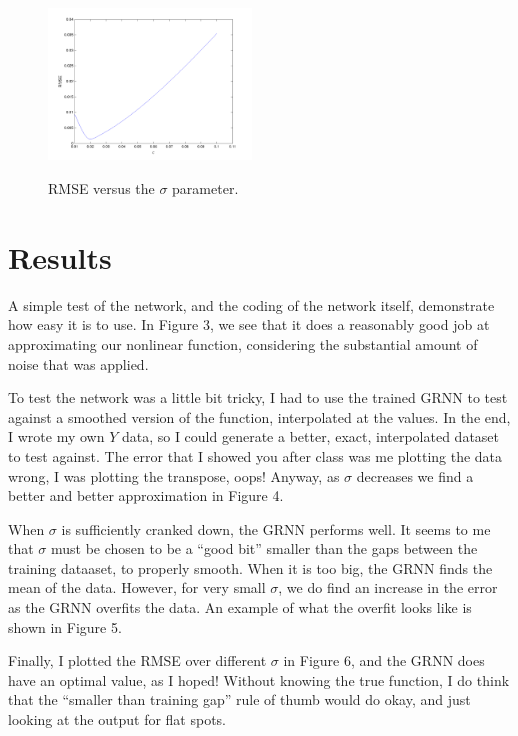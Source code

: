 \documentclass[pre,twocolumn,twoside,byrevtex,superscriptaddress]{revtex4}
\begin{document}
\begin{figure}
 \centering
  \includegraphics[width=0.48\textwidth]{../figures/GRNN-givenData-allsigma-sqdiff-RMSE-correct.png}
  \label{fig:5}
  \caption{RMSE versus the $\sigma$ parameter.}
\end{figure}

\section{Results}

A simple test of the network, and the coding of the network itself, demonstrate how easy it is to use.
In Figure 3, we see that it does a reasonably good job at approximating our nonlinear function, considering the substantial amount of noise that was applied.

To test the network was a little bit tricky, I had to use the trained GRNN to test against a smoothed version of the function, interpolated at the values.
In the end, I wrote my own $Y$ data, so I could generate a better, exact, interpolated dataset to test against.
The error that I showed you after class was me plotting the data wrong, I was plotting the transpose, oops!
Anyway, as $\sigma$ decreases we find a better and better approximation in Figure 4.

When $\sigma$ is sufficiently cranked down, the GRNN performs well.
It seems to me that $\sigma$ must be chosen to be a ``good bit'' smaller than the gaps between the training dataaset, to properly smooth.
When it is too big, the GRNN finds the mean of the data.
However, for very small $\sigma$, we do find an increase in the error as the GRNN overfits the data.
An example of what the overfit looks like is shown in Figure 5.

Finally, I plotted the RMSE over different $\sigma$ in Figure 6, and the GRNN does have an optimal value, as I hoped!
Without knowing the true function, I do think that the ``smaller than training gap'' rule of thumb would do okay, and just looking at the output for flat spots.
\end{document}
